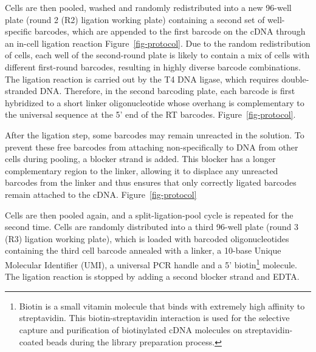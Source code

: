 \documentclass[
  11pt,
  a4paper,
]{report}
\begin{document}
Cells are then pooled, washed and randomly redistributed into a new
96-well plate (round 2 (R2) ligation working plate) containing a second
set of well-specific barcodes, which are appended to the first barcode
on the cDNA through an in-cell ligation reaction
Figure~\ref{fig-protocol}. Due to the random redistribution of cells,
each well of the second-round plate is likely to contain a mix of cells
with different first-round barcodes, resulting in highly diverse barcode
combinations. The ligation reaction is carried out by the T4 DNA ligase,
which requires double-stranded DNA. Therefore, in the second barcoding
plate, each barcode is first hybridized to a short linker
oligonucleotide whose overhang is complementary to the universal
sequence at the 5' end of the RT barcodes. Figure~\ref{fig-protocol}.

\begin{tcolorbox}[enhanced jigsaw, arc=.35mm, colbacktitle=quarto-callout-note-color!10!white, rightrule=.15mm, title=\textcolor{quarto-callout-note-color}{\faInfo}\hspace{0.5em}{Note}, coltitle=black, bottomrule=.15mm, left=2mm, opacityback=0, colback=white, toprule=.15mm, toptitle=1mm, titlerule=0mm, breakable, bottomtitle=1mm, opacitybacktitle=0.6, colframe=quarto-callout-note-color-frame, leftrule=.75mm]

After the ligation step, some barcodes may remain unreacted in the
solution. To prevent these free barcodes from attaching non-specifically
to DNA from other cells during pooling, a blocker strand is added. This
blocker has a longer complementary region to the linker, allowing it to
displace any unreacted barcodes from the linker and thus ensures that
only correctly ligated barcodes remain attached to the cDNA.
Figure~\ref{fig-protocol}

\end{tcolorbox}

Cells are then pooled again, and a split-ligation-pool cycle is repeated
for the second time. Cells are randomly distributed into a third 96-well
plate (round 3 (R3) ligation working plate), which is loaded with
barcoded oligonucleotides containing the third cell barcode annealed
with a linker, a 10-base Unique Molecular Identifier (UMI), a universal
PCR handle and a 5' biotin\footnote{Biotin is a small vitamin molecule
  that binds with extremely high affinity to streptavidin. This
  biotin-streptavidin interaction is used for the selective capture and
  purification of biotinylated cDNA molecules on streptavidin-coated
  beads during the library preparation process.} molecule. The ligation
reaction is stopped by adding a second blocker strand and EDTA.
\end{document}
